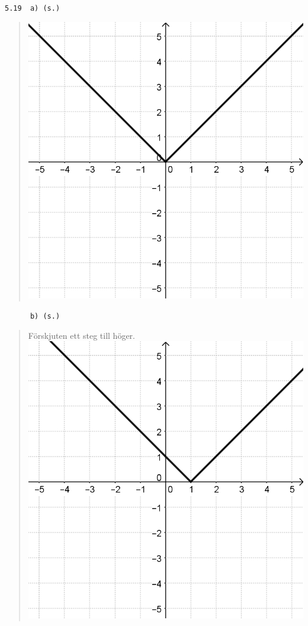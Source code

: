 \documentclass[a4paper]{article}
\newcommand{\tskcol}[1]{\textcolor{tskcol}{#1}}
\begin{document}
	\texttt{\tskcol{5.19~~a) (s.)}}
	\begin{quotation}
		\noindent
		\includegraphics[scale=0.2]{images/519a.png}
	\end{quotation}
	
	\texttt{\tskcol{~~~~~~b) (s.)}}
	\begin{quotation}
		\noindent
		Förskjuten ett steg till höger. \\
		\includegraphics[scale=0.2]{images/519b.png}
	\end{quotation}
	
\end{document}
